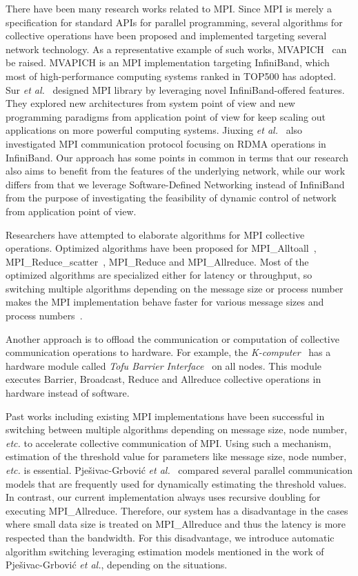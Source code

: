 There have been many research works related to MPI\@. Since MPI is merely a
specification for standard APIs for parallel programming, several algorithms
for collective operations have been proposed and implemented targeting several
network technology. As a representative example of such works,
MVAPICH~\autocite{mvapich} can be raised. MVAPICH is an MPI implementation
targeting InfiniBand, which most of high-performance computing systems ranked
in TOP500 has adopted. Sur \emph{et al.}~\autocite{Sur2011} designed MPI
library by leveraging novel InfiniBand-offered features.
They explored new architectures from system point of view and new programming
paradigms from application point of view for keep scaling out applications on
more powerful computing systems. Jiuxing \emph{et al.}~\autocite{Jiuxing2004}
also investigated MPI communication protocol focusing on RDMA operations in
InfiniBand. Our approach has some points in common in terms that our research
also aims to benefit from the features of the underlying network, while our
work differs from that we leverage Software-Defined Networking instead of
InfiniBand from the purpose of investigating the feasibility of dynamic
control of network from application point of view.

Researchers have attempted to elaborate algorithms for MPI collective
operations. Optimized algorithms have been proposed for
MPI\_Alltoall~\autocite{Bruck1997},
MPI\_Reduce\_scatter~\autocite{Iannello1997}, MPI\_Reduce and MPI\_Allreduce.
Most of the optimized algorithms are specialized either for latency or
throughput, so switching multiple algorithms depending on the message size or
process number makes the MPI implementation behave faster for various message
sizes and process numbers~\autocite{Thakur2005}.

Another approach is to offload the communication or computation of collective
communication operations to hardware. For example, the
\emph{K-computer}~\autocite{Yokokawa2011} has a hardware module called
\emph{Tofu Barrier Interface}~\autocite{Ajima2012} on all nodes. This module
executes Barrier, Broadcast, Reduce and Allreduce collective operations in
hardware instead of software.

Past works including existing MPI implementations have been successful
in switching between multiple algorithms depending on message size, node
number, \emph{etc.} to accelerate collective communication of MPI\@. Using
such a mechanism, estimation of the threshold value for parameters like
message size, node number, \emph{etc.} is essential. Pje\v{s}ivac-Grbovi\'{c}
\emph{et al.}~\autocite{PjesivacGrbovic2007} compared several parallel
communication models that are frequently used for dynamically estimating the
threshold values. In contrast, our current implementation always uses
recursive doubling for executing MPI\_Allreduce. Therefore, our system has a
disadvantage in the cases where small data size is treated on MPI\_Allreduce
and thus the latency is more respected than the bandwidth. For this
disadvantage, we introduce automatic algorithm switching leveraging estimation
models mentioned in the work of Pje\v{s}ivac-Grbovi\'{c} \emph{et al.},
depending on the situations.

